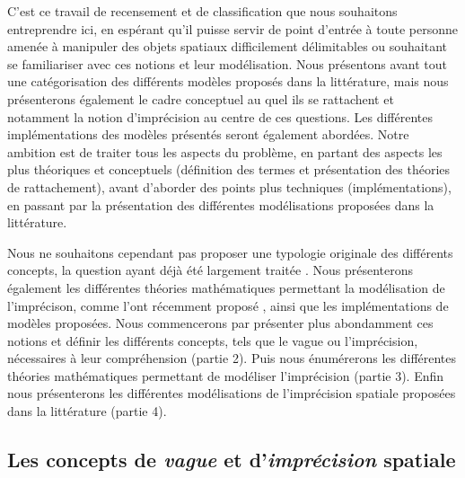 C’est ce travail de recensement et de classification que nous
souhaitons entreprendre ici, en espérant qu’il puisse servir de point
d’entrée à toute personne amenée à manipuler des objets spatiaux
difficilement délimitables ou souhaitant se familiariser avec ces
notions et leur modélisation. Nous présentons avant tout une
catégorisation des différents modèles proposés dans la littérature,
mais nous présenterons également le cadre conceptuel au quel ils se
rattachent et notamment la notion d’imprécision au centre de ces
questions. Les différentes implémentations des modèles présentés
seront également abordées. Notre ambition est de traiter tous les
aspects du problème, en partant des aspects les plus théoriques et
conceptuels (définition des termes et présentation des théories de
rattachement), avant d’aborder des points plus techniques
(implémentations), en passant par la présentation des différentes
modélisations proposées dans la littérature.

Nous ne souhaitons cependant pas proposer une typologie originale des
différents concepts, la question ayant déjà été largement traitée
\autocite{Bouchon-Meunier1995,Fisher2006,Devilliers2019}. Nous
présenterons également les différentes théories mathématiques
permettant la modélisation de l’imprécison, comme l’ont récemment
proposé \textcite{Batton-Hubert2019}, ainsi que les implémentations de
modèles proposées.  Nous commencerons par présenter plus abondamment
ces notions et définir les différents concepts, tels que le vague ou
l’imprécision, nécessaires à leur compréhension (partie 2). Puis nous
énumérerons les différentes théories mathématiques permettant de
modéliser l’imprécision (partie 3). Enfin nous présenterons les
différentes modélisations de l’imprécision spatiale proposées dans la
littérature (partie 4).


\subsection{Les concepts de \emph{vague} et d’\emph{imprécision}
  spatiale}

